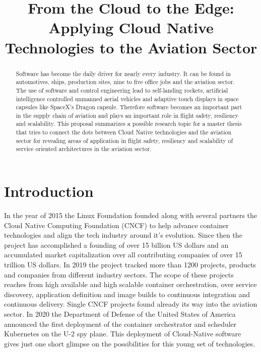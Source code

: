\documentclass[conference]{IEEEtran}
\begin{document}
\title{From the Cloud to the Edge: Applying Cloud Native Technologies to the Aviation Sector}
\author{
}

\maketitle

\begin{abstract}
Software has become the daily driver for nearly every industry. It can be found
in automotives, ships, production sites, nine to five office jobs and the aviation
sector. The use of software and control engineering lead to self-landing rockets,
artificial intelligence controlled unmanned aerial vehicles and adaptive touch displays
in space capsules like SpaceX's Dragon capsule. Therefore software becomes an
important part in the supply chain of aviation and plays an important role
in flight safety, resiliency and scalability. This proposal summarizes a possible
research topic for a master thesis that tries to connect the dots between Cloud Native
technologies and the aviation sector for revealing areas of application in flight safety, resiliency
and scalability of service oriented architectures in the aviation sector.
\end{abstract}

\IEEEpeerreviewmaketitle

\section*{Introduction}
In the year of 2015 the Linux Foundation founded along with several partners the Cloud Native Computing
Foundation (CNCF) to help advance container technologies and align the tech industry
around it's evolution\cite{CNCFFounding}. Since then the project has accomplished
a founding of over 15 billion US dollars and an accumulated market capitalization 
over all contributing companies of over 15 trillion US dollars\cite{CNCFLandscape}.
In 2019 the project tracked more than 1200 projects, products and companies from different
industry sectors\cite{CNCFAnnualReport2019}. The scope of these projects reaches from
high available and high scalable container orchestration, over service discovery,
application definition and image builds to continuous integration and continuous delivery.
Single CNCF projects found already its way into the aviation sector. In 2020 the Department
of Defense of the United States of America announced the first deployment of the
container orchestrator and scheduler Kubernetes on the U-2 spy plane. This deployment
of Cloud-Native software gives just one short glimpse on the possibilities for
this young set of technologies.
\end{document}
